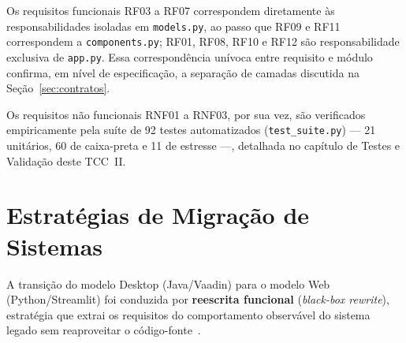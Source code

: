 Os requisitos funcionais RF03 a RF07 correspondem diretamente às responsabilidades
isoladas em \texttt{models.py}, ao passo que RF09 e RF11 correspondem a
\texttt{components.py}; RF01, RF08, RF10 e RF12 são responsabilidade exclusiva de
\texttt{app.py}. Essa correspondência unívoca entre requisito e módulo confirma, em nível
de especificação, a separação de camadas discutida na Seção~\ref{sec:contratos}.

Os requisitos não funcionais RNF01 a RNF03, por sua vez, são verificados empiricamente
pela suíte de 92 testes automatizados (\texttt{test\_suite.py}) — 21 unitários, 60 de
caixa-preta e 11 de estresse —, detalhada no capítulo de Testes e Validação deste TCC~II.

\section{Estratégias de Migração de Sistemas}

A transição do modelo Desktop (Java/Vaadin) para o modelo Web (Python/Streamlit) foi
conduzida por \textbf{reescrita funcional} (\textit{black-box rewrite}), estratégia que
extrai os requisitos do comportamento observável do sistema legado sem reaproveitar o
código-fonte~\cite{becker2020}.

